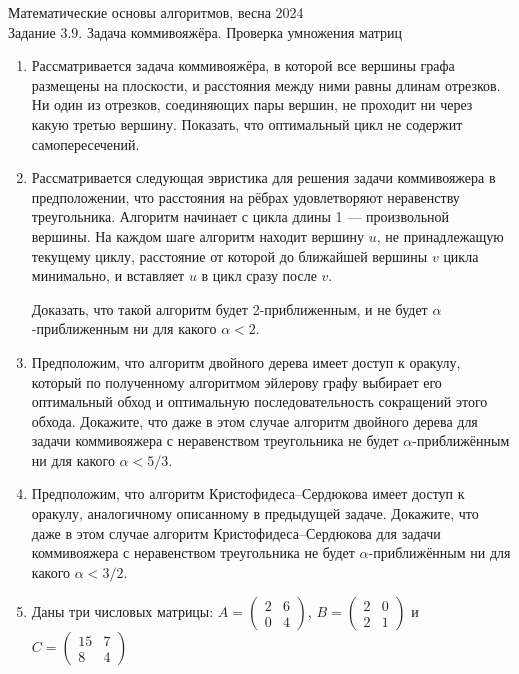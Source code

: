 \documentclass[11pt]{article}
\newenvironment{exercise}{\item}{}
\begin{document}
\begin{center}
	\Large Математические основы алгоритмов, весна 2024 \\
	\Large Задание \(3.9\). Задача коммивояжёра. Проверка умножения матриц
\end{center}


\begin{enumerate}

\begin{exercise}
Рассматривается задача коммивояжёра, в которой все вершины графа размещены на плоскости,
и расстояния между ними равны длинам отрезков.
Ни один из отрезков, соединяющих пары вершин, не проходит ни через какую третью вершину.
Показать, что оптимальный цикл не содержит самопересечений.

\end{exercise}

\begin{exercise}
Рассматривается следующая эвристика для решения задачи коммивояжера
в предположении, что расстояния на рёбрах удовлетворяют неравенству треугольника.
Алгоритм начинает с цикла длины 1 --- произвольной вершины.
На каждом шаге алгоритм находит вершину $u$, не принадлежащую текущему циклу,
расстояние от которой до ближайшей вершины $v$ цикла минимально,
и вставляет $u$ в цикл сразу после $v$.

Доказать, что такой алгоритм будет 2-приближенным,
и не будет $\alpha$-приближенным ни для какого $\alpha < 2$.
\end{exercise}

\begin{exercise}
Предположим, что алгоритм двойного дерева имеет доступ к оракулу,
который по полученному алгоритмом эйлерову графу 
выбирает его оптимальный обход и оптимальную последовательность сокращений этого обхода.
Докажите, что даже в этом случае алгоритм двойного дерева 
для задачи коммивояжера с неравенством треугольника 
не будет $\alpha$-приближённым ни для какого $\alpha<5/3$.
\end{exercise}

\begin{exercise}
Предположим, что алгоритм Кристофидеса--Сердюкова имеет доступ к оракулу,
аналогичному описанному в предыдущей задаче.
Докажите, что даже в этом случае алгоритм Кристофидеса--Сердюкова 
для задачи коммивояжера с неравенством треугольника
не будет $\alpha$-приближённым ни для какого $\alpha<3/2$.
\end{exercise}

\begin{exercise}
Даны три числовых матрицы:
$A=\left(\begin{matrix} 2 & 6 \\ 0 & 4 \end{matrix}\right)$,
$B=\left(\begin{matrix} 2 & 0 \\ 2 & 1 \end{matrix}\right)$ 
и
$C=\left(\begin{matrix} 15 & 7 \\ 8 & 4 \end{matrix}\right)$ 


\end{exercise}
\end{enumerate}
\end{document}
